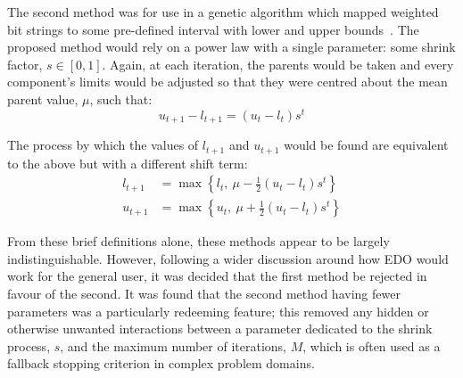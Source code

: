 The second method was for use in a genetic algorithm which mapped weighted bit
strings to some pre-defined interval with lower and upper
bounds~\cite{Amirjanov2016}. The proposed method would rely on a power law with
a single parameter: some shrink factor, \(s \in [0, 1]\). Again, at each
iteration, the parents would be taken and every component's limits would be
adjusted so that they were centred about the mean parent value, \(\mu\), such
that:
\[
    u_{t+1} - l_{t+1} = (u_t - l_t) s^t
\]

The process by which the values of \(l_{t+1}\) and \(u_{t+1}\) would be found
are equivalent to the above but with a different shift term:
\begin{align}
    \label{eq:shrinking_lower}
    l_{t+1}&= \max \left\{l_t, \ \mu - \frac{1}{2} (u_t - l_t) s^t\right\}\\
    \label{eq:shrinking_upper}
    u_{t+1}&= \max \left\{u_t, \ \mu + \frac{1}{2} (u_t - l_t) s^t\right\}
\end{align}

From these brief definitions alone, these methods appear to be largely
indistinguishable. However, following a wider discussion around how EDO would
work for the general user, it was decided that the first method be rejected in
favour of the second. It was found that the second method having fewer
parameters was a particularly redeeming feature; this removed any hidden or
otherwise unwanted interactions between a parameter dedicated to the shrink
process, \(s\), and the maximum number of iterations, \(M\), which is often used
as a fallback stopping criterion in complex problem domains.



